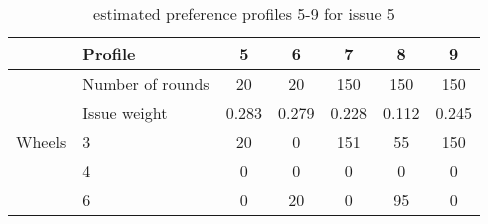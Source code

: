\begin{table}[H]
\centering
\caption{estimated preference profiles 5-9 for issue 5}
\label{tab:issue5estimation}
\begin{tabular}{|p{3cm}|p{3cm}||c|c||c|c|c|}
\hline
&Profile & 5 & 6 & 7 & 8 & 9 \\
\hline
&Number of rounds & 20 & 20 & 150 & 150 & 150 \\
\hline
&Issue weight& 0.283 & 0.279 & 0.228 & 0.112 & 0.245 \\
\hline
\hline
Wheels &3   & 20 & 0  & 151 & 55 & 150 \\
       &4   & 0  & 0  & 0   & 0  & 0 \\
       &6   & 0  & 20 & 0   & 95 & 0 \\
\hline
\end{tabular}
\end{table}